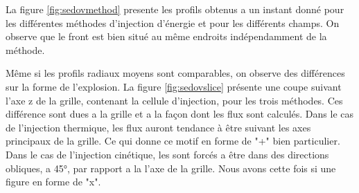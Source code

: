 La figure \ref{fig:sedovmethod} presente les profils obtenus a un instant donné pour les différentes méthodes d'injection d'énergie et pour les différents champs.
On observe que le front est bien situé au même endroits indépendamment de la méthode.



Même si les profils radiaux moyens sont comparables, on observe des différences sur la forme de l'explosion.
La figure \ref{fig:sedovslice} présente une coupe suivant l'axe z de la grille, contenant la cellule d'injection, pour les trois méthodes.
Ces différence sont dues a la grille et a la façon dont les flux sont calculés.
Dans le cas de l'injection thermique, les flux auront tendance à être suivant les axes principaux de la grille.
Ce qui donne ce motif en forme de "+" bien particulier.
Dans le cas de l'injection cinétique, les sont forcés a être dans des directions obliques, a 45°, par rapport a la l'axe de la grille.
Nous avons cette fois si une figure en forme de "x".




